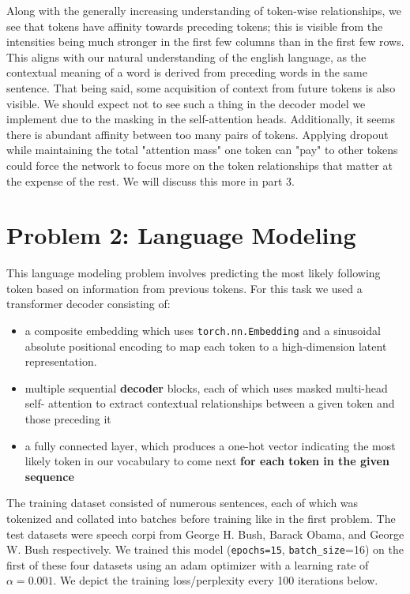 \documentclass[10pt]{article}
\newcommand{\code}[1]{\texttt{#1}}
\theoremstyle{definition}
\begin{document}
\noindent Along with the generally increasing understanding of token-wise relationships, we see that tokens have affinity towards preceding tokens; this is visible from the intensities being much stronger in the first few columns than in the first few rows. This aligns with our natural understanding of the english language, as the contextual meaning of a word is derived from preceding words in the same sentence. That being said, some acquisition of context from future tokens is also visible. We should expect not to see such a thing in the decoder model we implement due to the masking in the self-attention heads. Additionally, it seems there is abundant affinity between too many pairs of tokens. Applying dropout while maintaining the total "attention mass" one token can "pay" to other tokens could force the network to focus more on the token relationships that matter at the expense of the rest. We will discuss this more in part 3.

\section{Problem 2: Language Modeling}
This language modeling problem involves predicting the most likely following token based on information from previous tokens. For this task we used a transformer decoder consisting of:
\begin{itemize}
    \item a composite embedding which uses \code{torch.nn.Embedding} and a sinusoidal absolute positional encoding to map each token to a high-dimension latent representation.
    \item multiple sequential \textbf{decoder} blocks, each of which uses masked multi-head self- attention to extract contextual relationships between a given token and those preceding it
    \item a fully connected layer, which produces a one-hot vector indicating the most likely token in our vocabulary to come next \textbf{for each token in the given sequence}
\end{itemize}

\noindent The training dataset consisted of numerous sentences, each of which was tokenized and collated into batches before training like in the first problem. The test datasets were speech corpi from George H. Bush, Barack Obama, and George W. Bush respectively. We trained this model (\code{epochs=15}, \code{batch\_size}=16) on the first of these four datasets using an adam optimizer with a learning rate of $\alpha = 0.001$. We depict the training loss/perplexity every 100 iterations below.
\end{document}
